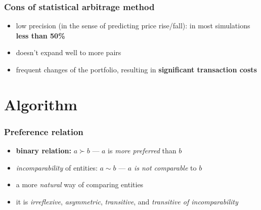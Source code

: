 \documentclass[11pt]{beamer}
\newcommand{\q}{\left}
\newcommand{\w}{\right}
\renewcommand{\alert}{\textbf}
\begin{document}

  \begin{frame}
    \frametitle{Cons of statistical arbitrage method}
    \begin{itemize}
      \item low precision (in the sense of predicting price rise/fall): in most simulations \textbf{less than 50\%}
      \item doesn't expand well to more pairs
      \item frequent changes of the portfolio, resulting in \alert{significant transaction costs}
    \end{itemize}
  \end{frame}

  \section{Algorithm}
  \begin{frame}
    \frametitle{Preference relation}
    \begin{itemize}
      \item \textbf{binary relation:} $a \succ b$ --- $a$ is \emph{more preferred} than $b$
      \item \emph{incomparability} of entities: $a \sim b$ --- $a$ \emph{is not comparable} to $b$
      \item a more \emph{natural} way of comparing entities
      \item it is \emph{irreflexive}, \emph{asymmetric}, \emph{transitive}, and \emph{transitive of incomparability} 
    \end{itemize}
  \end{frame}
\end{document}
